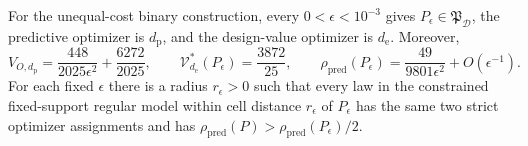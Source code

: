 For the unequal-cost binary construction, every \(0<\epsilon<10^{-3}\) gives \(P_{\epsilon}\in\mathfrak P_{\mathcal D}\), the predictive optimizer is \(d_{\mathrm p}\), and the design-value optimizer is \(d_{\mathrm e}\). Moreover,
\[
V_{O,d_{\mathrm p}}=\frac{448}{2025\epsilon^2}+\frac{6272}{2025},\qquad
\mathcal V_{d_{\mathrm e}}^*(P_{\epsilon})=\frac{3872}{25},\qquad
\rho_{\mathrm{pred}}(P_{\epsilon})=\frac{49}{9801\epsilon^2}+O(\epsilon^{-1}).
\]
For each fixed \(\epsilon\) there is a radius \(r_\epsilon>0\) such that every law in the constrained fixed-support regular model within cell distance \(r_\epsilon\) of \(P_\epsilon\) has the same two strict optimizer assignments and has \(\rho_{\mathrm{pred}}(P)>\rho_{\mathrm{pred}}(P_\epsilon)/2\).